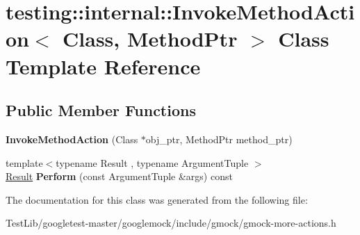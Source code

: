 \hypertarget{classtesting_1_1internal_1_1InvokeMethodAction}{}\section{testing\+:\+:internal\+:\+:Invoke\+Method\+Action$<$ Class, Method\+Ptr $>$ Class Template Reference}
\label{classtesting_1_1internal_1_1InvokeMethodAction}
\subsection*{Public Member Functions}
\begin{DoxyCompactItemize}
\item 
\mbox{\label{classtesting_1_1internal_1_1InvokeMethodAction_a16e545f6166e2d54eeafdc2ab3adf06b}} 
{\bfseries Invoke\+Method\+Action} (Class $\ast$obj\+\_\+ptr, Method\+Ptr method\+\_\+ptr)
\item 
\mbox{\label{classtesting_1_1internal_1_1InvokeMethodAction_aed6971c668bc2c7671d512306b25b1ab}} 
{\footnotesize template$<$typename Result , typename Argument\+Tuple $>$ }\\\hyperlink{classResult}{Result} {\bfseries Perform} (const Argument\+Tuple \&args) const
\end{DoxyCompactItemize}


The documentation for this class was generated from the following file\+:\begin{DoxyCompactItemize}
\item 
Test\+Lib/googletest-\/master/googlemock/include/gmock/gmock-\/more-\/actions.\+h\end{DoxyCompactItemize}
